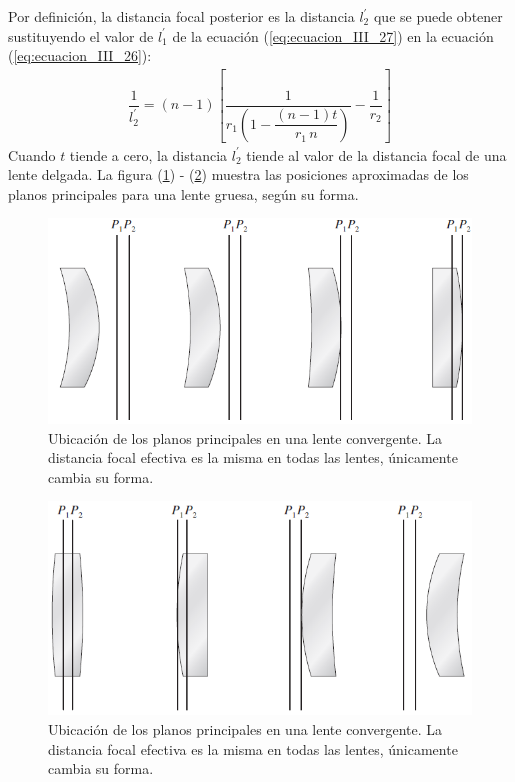 \documentclass[14pt]{extarticle}
\begin{document}
Por definición, la distancia focal posterior es la distancia $l_{2}^{\prime}$ que se puede obtener sustituyendo el valor de $l_{1}^{\prime}$ de la ecuación (\ref{eq:ecuacion_III_27}) en la ecuación (\ref{eq:ecuacion_III_26}):
\begin{align}
\dfrac{1}{l_{2}^{\prime}} = (n - 1) \left[ \dfrac{1}{r_{1} \left( 1 - \dfrac{(n - 1) t}{r_{1} \, n} \right)} - \dfrac{1}{r_{2}} \right]
\label{eq:ecuacion_III_30}
\end{align}
Cuando $t$ tiende a cero, la distancia $l_{2}^{\prime}$ tiende al valor de la distancia focal de una lente delgada. La figura (\ref{fig:figura_III_07a}) - (\ref{fig:figura_III_07b}) muestra las posiciones aproximadas de los planos principales para una lente gruesa, según su forma.
\begin{figure}[H]
    \centering
    \includegraphics[scale=0.7]{Imagenes/Lentes_Gruesas_06a.png}
    \caption{Ubicación de los planos principales en una lente convergente. La distancia focal efectiva es la misma en todas las lentes, únicamente cambia su forma.}
    \label{fig:figura_III_07a}
\end{figure}
\begin{figure}[H]
    \centering
    \includegraphics[scale=0.7]{Imagenes/Lentes_Gruesas_06b.png}
    \caption{Ubicación de los planos principales en una lente convergente. La distancia focal efectiva es la misma en todas las lentes, únicamente cambia su forma.}
    \label{fig:figura_III_07b}
\end{figure}
\end{document}
